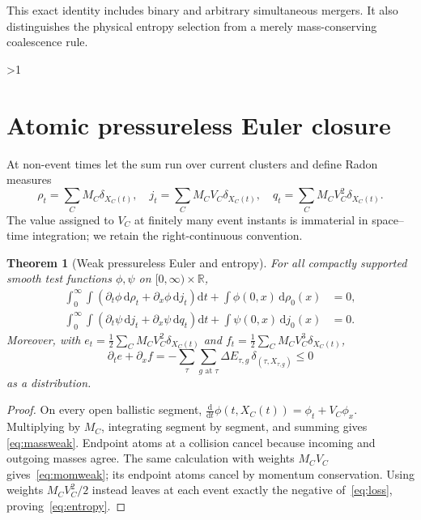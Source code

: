 \documentclass[10pt]{article}
\providecommand{\CRevisionRound}{2}
\newtheorem{theorem}{Theorem}
\newcommand{\R}{\mathbb R}
\newcommand{\D}{\mathrm d}
\begin{document}
This exact identity includes binary and arbitrary simultaneous mergers.  It
also distinguishes the physical entropy selection from a merely
mass-conserving coalescence rule.
\fi

\ifnum\CRevisionRound>1
\section{Atomic pressureless Euler closure}
At non-event times let the sum run over current clusters and define Radon
measures
\begin{equation}\label{eq:measures}
 \rho_t=\sum_C M_C\delta_{X_C(t)},\quad
 j_t=\sum_C M_CV_C\delta_{X_C(t)},\quad
 q_t=\sum_C M_CV_C^2\delta_{X_C(t)}.
\end{equation}
The value assigned to $V_C$ at finitely many event instants is immaterial in
space--time integration; we retain the right-continuous convention.

\begin{theorem}[Weak pressureless Euler and entropy]\label{thm:pde}
For all compactly supported smooth test functions $\phi,\psi$ on
$[0,\infty)\times\R$,
\begin{align}
 \int_0^\infty\!\!\int
   (\partial_t\phi\,\D\rho_t+\partial_x\phi\,\D j_t)\D t
   +\int\phi(0,x)\,\D\rho_0(x)&=0,\label{eq:massweak}\\
 \int_0^\infty\!\!\int
   (\partial_t\psi\,\D j_t+\partial_x\psi\,\D q_t)\D t
   +\int\psi(0,x)\,\D j_0(x)&=0.\label{eq:momweak}
\end{align}
Moreover, with
$e_t=\frac12\sum_CM_CV_C^2\delta_{X_C(t)}$ and
$f_t=\frac12\sum_CM_CV_C^3\delta_{X_C(t)}$,
\begin{equation}\label{eq:entropy}
 \partial_t e+\partial_x f
 =-\sum_{\tau}\sum_{g\text{ at }\tau}
   \Delta E_{\tau,g}\,\delta_{(\tau,X_{\tau,g})}\leq0
\end{equation}
as a distribution.
\end{theorem}
\begin{proof}
On every open ballistic segment,
$\frac{\D}{\D t}\phi(t,X_C(t))=\phi_t+V_C\phi_x$.
Multiplying by $M_C$, integrating segment by segment, and summing gives
\eqref{eq:massweak}.  Endpoint atoms at a collision cancel because incoming
and outgoing masses agree.  The same calculation with weights $M_CV_C$
gives~\eqref{eq:momweak}; its endpoint atoms cancel by momentum conservation.
Using weights $M_CV_C^2/2$ instead leaves at each event exactly the negative
of~\eqref{eq:loss}, proving~\eqref{eq:entropy}.
\end{proof}
\end{document}
